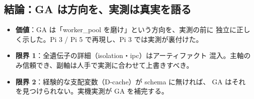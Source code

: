 \subsection{結論：GA は方向を、実測は真実を語る}

\begin{itemize}[leftmargin=1.6em]
  \item \textbf{価値}：GA は「worker\_pool を磨け」という方向を、実測の前に
        独立に正しく示した。Pi 3 / Pi 5 で再現し、Pi 3 では実測が裏付けた。
  \item \textbf{限界 1}：全遺伝子の詳細（isolation・ipc）はアーティファクト
        混入。主軸のみ信頼でき、副軸は人手で実測に合わせて上書きすべき。
  \item \textbf{限界 2}：経験的な支配変数（D-cache）が schema に無ければ、
        GA はそれを見つけられない。実機実測が GA を補完する。
\end{itemize}
